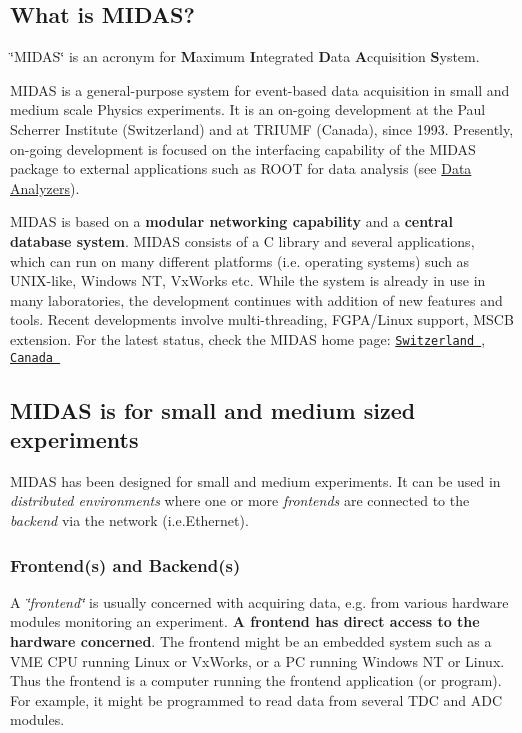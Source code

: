 \par
  \par


\label{Intro_idx_MIDAS}
\hypertarget{Intro_idx_MIDAS}{}
 \hypertarget{Intro_I_WhatIsMidas}{}\subsection{What is MIDAS?}\label{Intro_I_WhatIsMidas}
\char`\"{}MIDAS\char`\"{} is an acronym for {\bfseries M}aximum {\bfseries I}ntegrated {\bfseries D}ata {\bfseries A}cquisition {\bfseries S}ystem. \par
\par
 MIDAS is a general-\/purpose system for event-\/based data acquisition in small and medium scale Physics experiments. It is an on-\/going development at the Paul Scherrer Institute (Switzerland) and at TRIUMF (Canada), since 1993. Presently, on-\/going development is focused on the interfacing capability of the MIDAS package to external applications such as ROOT for data analysis (see \hyperlink{DataAnalysis_DA_Data_analyzers}{Data Analyzers}).

MIDAS is based on a {\bfseries modular networking capability} and a {\bfseries central database system}. MIDAS consists of a C library and several applications, which can run on many different platforms (i.e. operating systems) such as UNIX-\/like, Windows NT, VxWorks etc. While the system is already in use in many laboratories, the development continues with addition of new features and tools. Recent developments involve multi-\/threading, FGPA/Linux support, MSCB extension. For the latest status, check the MIDAS home page: \href{http://midas.psi.ch}{\tt Switzerland }, \href{http://midas.triumf.ca}{\tt Canada }\hypertarget{Intro_I_Midas_exp}{}\subsection{MIDAS is for small and medium sized experiments}\label{Intro_I_Midas_exp}
MIDAS has been designed for small and medium experiments. It can be used in {\itshape distributed environments\/} where one or more {\itshape frontends\/} are connected to the {\itshape backend\/} via the network (i.e.Ethernet).

\label{Intro_idx_frontend}
\hypertarget{Intro_idx_frontend}{}
 \label{Intro_idx_backend}
\hypertarget{Intro_idx_backend}{}
 \hypertarget{Intro_I_FE_and_BE}{}\subsubsection{Frontend(s) and Backend(s)}\label{Intro_I_FE_and_BE}
A {\itshape \char`\"{}frontend\char`\"{}\/} is usually concerned with acquiring data, e.g. from various hardware modules monitoring an experiment. {\bfseries A frontend has direct access to the hardware concerned}. The frontend might be an embedded system such as a VME CPU running Linux or VxWorks, or a PC running Windows NT or Linux. Thus the frontend is a computer running the frontend application (or program). For example, it might be programmed to read data from several TDC and ADC modules.

